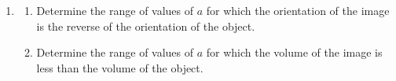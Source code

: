 \documentclass[leqno]{article}
\begin{document}
\begin{enumerate}[
  label=\textbf{\arabic*.},
  leftmargin=*,
  topsep=0pt,
  partopsep=0pt,
  parsep=0pt
]
\begin{enumerate}[label=\textbf{(\alph*)}, resume]
  \item
  \begin{enumerate}[label=(\roman*)]
    \item Determine the range of values of $a$ for which the orientation of the image is the reverse of the orientation of the object. 
    \item Determine the range of values of $a$ for which the volume of the image is less than the volume of the object.  \\
  \end{enumerate}
\end{enumerate}
\end{enumerate}
\end{document}
